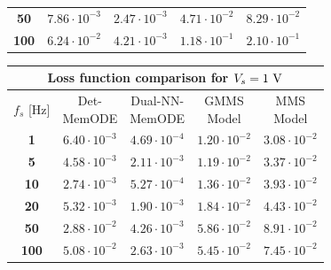 \documentclass[lettersize,journal]{IEEEtran}
\begin{document}
\begin{table}
\begin{tabular}{c|cccc}
    \textbf{50}  & \(7.86 \cdot 10^{-3}\) & \color{ieeegreen} \bfseries \(2.47 \cdot 10^{-3}\) & \(4.71 \cdot 10^{-2}\) & \color{ieeered} \bfseries \(8.29 \cdot 10^{-2}\) \\
    \textbf{100} & \(6.24 \cdot 10^{-2}\) & \color{ieeegreen} \bfseries \(4.21 \cdot 10^{-3}\) & \(1.18 \cdot 10^{-1}\) & \color{ieeered} \bfseries \(2.10 \cdot 10^{-1}\) \\
    \bottomrule
  \end{tabular}
  \begin{tabular}{c|cccc}
    \toprule
    \multicolumn{5}{c}{\textbf{Loss function comparison for \(V_s = 1 \rm \ V\)}}                                                                                          \\
    \midrule
    \(f_s\) [Hz] & \makecell{Det-                                                                                                                                          \\MemODE}             & \makecell{Dual-NN-                                                                                                             \\ MemODE}                 & \makecell{GMMS\\Model}             & \makecell{MMS\\Model}                                        \\
    \midrule
    \textbf{1}   & \(6.40 \cdot 10^{-3}\) & \color{ieeegreen} \bfseries \(4.69 \cdot 10^{-4}\) & \(1.20 \cdot 10^{-2}\) & \color{ieeered} \bfseries \(3.08 \cdot 10^{-2}\) \\
    \textbf{5}   & \(4.58 \cdot 10^{-3}\) & \color{ieeegreen} \bfseries \(2.11 \cdot 10^{-3}\) & \(1.19 \cdot 10^{-2}\) & \color{ieeered} \bfseries \(3.37 \cdot 10^{-2}\) \\
    \textbf{10}  & \(2.74 \cdot 10^{-3}\) & \color{ieeegreen} \bfseries \(5.27 \cdot 10^{-4}\) & \(1.36 \cdot 10^{-2}\) & \color{ieeered} \bfseries \(3.93 \cdot 10^{-2}\) \\
    \textbf{20}  & \(5.32 \cdot 10^{-3}\) & \color{ieeegreen} \bfseries \(1.90 \cdot 10^{-3}\) & \(1.84 \cdot 10^{-2}\) & \color{ieeered} \bfseries \(4.43 \cdot 10^{-2}\) \\
    \textbf{50}  & \(2.88 \cdot 10^{-2}\) & \color{ieeegreen} \bfseries \(4.26 \cdot 10^{-3}\) & \(5.86 \cdot 10^{-2}\) & \color{ieeered} \bfseries \(8.91 \cdot 10^{-2}\) \\
    \textbf{100} & \(5.08 \cdot 10^{-2}\) & \color{ieeegreen} \bfseries \(2.63 \cdot 10^{-3}\) & \(5.45 \cdot 10^{-2}\) & \color{ieeered} \bfseries \(7.45 \cdot 10^{-2}\) \\

\end{tabular}
\end{table}
\end{document}

